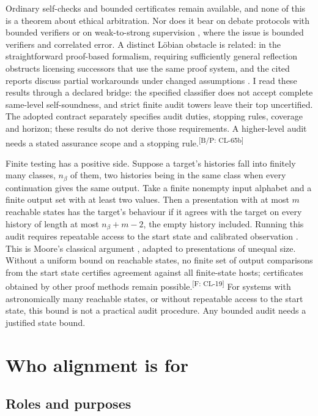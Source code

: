 \documentclass[pdflatex,sn-basic]{sn-jnl}%
\newcommand{\claim}[2]{\ifannotated\textsuperscript{\textcolor{blue!60!black}{\tiny[#1: #2]}}\fi}
\begin{document}
Ordinary self-checks and bounded certificates remain available, and none of this is a theorem about ethical arbitration. Nor does it bear on debate protocols with bounded verifiers \citep{irving2018,browncohen2024} or on weak-to-strong supervision \citep{burns2023}, where the issue is bounded verifiers and correlated error. A distinct L\"obian obstacle is related: in the straightforward proof-based formalism, requiring sufficiently general reflection obstructs licensing successors that use the same proof system, and the cited reports discuss partial workarounds under changed assumptions \citep{yudkowsky2013tiling,fallenstein2015}. I read these results through a declared bridge: the specified classifier does not accept complete same-level self-soundness, and strict finite audit towers leave their top uncertified. The adopted contract separately specifies audit duties, stopping rules, coverage and horizon; these results do not derive those requirements. A higher-level audit needs a stated assurance scope and a stopping rule.\claim{B/P}{CL-65b}

Finite testing has a positive side. Suppose a target's histories fall into finitely many classes, $n_\beta$ of them, two histories being in the same class when every continuation gives the same output. Take a finite nonempty input alphabet and a finite output set with at least two values. Then a presentation with at most $m$ reachable states has the target's behaviour if it agrees with the target on every history of length at most $n_\beta+m-2$, the empty history included. Running this audit requires repeatable access to the start state and calibrated observation \citep{tsiokos2026v15}. This is Moore's classical argument \citep{moore1956}, adapted to presentations of unequal size. Without a uniform bound on reachable states, no finite set of output comparisons from the start state certifies agreement against all finite-state hosts; certificates obtained by other proof methods remain possible.\claim{F}{CL-19} For systems with astronomically many reachable states, or without repeatable access to the start state, this bound is not a practical audit procedure. Any bounded audit needs a justified state bound.

\section{Who alignment is for}\label{sec:who}

\subsection{Roles and purposes}\label{sec:roles}
\end{document}
